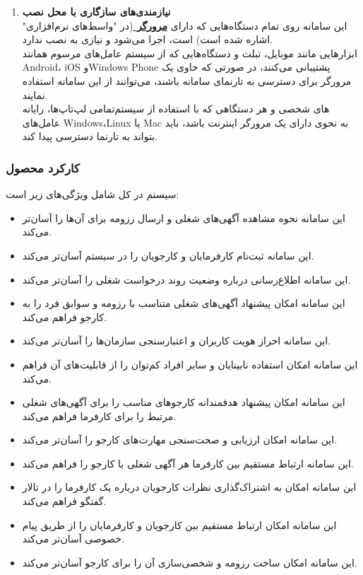 \documentclass[12pt]{article}
\begin{document}
\begin{enumerate}
		\item
		\textbf{نیازمندی‌های سازگاری با محل نصب}\\
		این سامانه روی تمام دستگاه‌هایی که دارای \textbf{\hyperref[ref:browser]{مرورگر }} (در "واسط‌های نرم‌افزاری" اشاره شده است) است، اجرا می‌شود و نیازی به نصب ندارد.\\
		ابزارهایی مانند موبایل، تبلت و دستگاه‌هایی که از سیستم عامل‌های مرسوم همانند Android، iOS وWindows Phone  پشتیبانی می‌کنند، در صورتی که حاوی یک مرورگر برای دسترسی به تارنمای سامانه باشند، می‌توانند از این سامانه استفاده نمایند.\\
		تمامی لپ‌تاپ‌ها، رایانه‎‌های شخصی و هر دستگاهی که با استفاده از سیستم عامل‌های Windows،Linux  یا Mac به نحوی دارای یک مرورگر اینترنت باشد، باید بتواند به تارنما دسترسی پیدا کند.
	\end{enumerate}

	\subsubsection{کارکرد محصول}
	سیستم در کل شامل ویژگی‌های زیر است:
	\begin{itemize}
		\item
		این سامانه نحوه مشاهده آگهی‌های شغلی و ارسال رزومه برای آن‌ها را آسان‌تر می‌کند.
		\item
		این سامانه ثبت‌نام کارفرمایان و کارجویان را در سیستم آسان‌تر می‌کند.
		\item
		این سامانه اطلاع‌رسانی درباره وضعیت روند درخواست شغلی را آسان‌تر می‌کند.
		\item
		این سامانه امکان پیشنهاد آگهی‌های شغلی متناسب با رزومه و سوابق فرد را به کارجو فراهم می‌کند.
		\item
		این سامانه احراز‌ هویت کاربران و اعتبارسنجی سازمان‌ها را آسان‌تر می‌کند.
		\item
		این سامانه امکان استفاده نابینایان و سایر افراد کم‌توان را از قابلیت‌های آن فراهم‌ می‌کند.
		\item
		این سامانه امکان پیشنهاد هدفمندانه کارجو‌های مناسب را برای آگهی‌های شغلی مرتبط را برای کارفرما فراهم می‌کند.
		\item
		این سامانه امکان ارزیابی و صحت‌سنجی مهارت‌های کارجو را آسان‌تر می‌کند.
		\item
		این سامانه ارتباط مستقیم بین کارفرما هر آگهی شغلی با کارجو را فراهم می‌کند.
		\item
		این سامانه امکان به اشتراک‌گذاری نظرات کارجویان درباره یک کارفرما را در تالار گفتگو فراهم می‌کند.
		\item
		این سامانه امکان ارتباط مستقیم بین کارجویان و کارفرمایان را از طریق پیام خصوصی آسان‌تر می‌کند.
		\item
		این سامانه امکان ساخت رزومه و شخصی‌سازی آن‌ را برای کارجو آسان‌تر می‌کند.
	\end{itemize}
\end{document}
